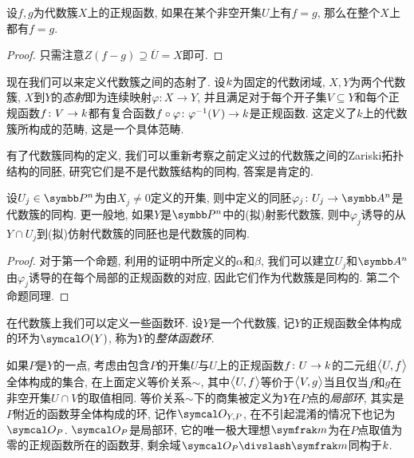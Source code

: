 \begin{proposition}\label{prop:regularstiffness}
    设$f, g$为代数簇$X$上的正规函数, 如果在某个非空开集$U$上有$f=g$, 那么在整个$X$上都有$f=g$.
\end{proposition}

\begin{proof}
    只需注意$Z(f-g)\supseteq \overline{U}=X$即可.
\end{proof}

现在我们可以来定义代数簇之间的态射了. 设$\kk$为固定的代数闭域, $X, Y$为两个代数簇, $X$到$Y$的\emph{态射}即为连续映射$\varphi\colon X\to Y$, 并且满足对于每个开子集$V\subseteq Y$和每个正规函数$f\colon V\to \kk$都有复合函数$f\circ\varphi\colon\varphi^{-1}(V)\to \kk$是正规函数. 这定义了$k$上的代数簇所构成的范畴, 这是一个具体范畴.

有了代数簇同构的定义, 我们可以重新考察之前定义过的代数簇之间的Zariski拓扑结构的同胚, 研究它们是不是代数簇结构的同构, 答案是肯定的.

\begin{proposition}
    设$U_j\in \PP^n$为由$X_j\neq 0$定义的开集, 则中定义的同胚$\varphi_j\colon U_j\to \AF^n$是代数簇的同构. 更一般地, 如果$Y$是$\PP^n$中的(拟)射影代数簇, 则中$\varphi_j$诱导的从$Y\cap U_j$到(拟)仿射代数簇的同胚也是代数簇的同构.
\end{proposition}

\begin{proof}
    对于第一个命题, 利用的证明中所定义的$\alpha$和$\beta$, 我们可以建立$U_j$和$\AF^n$由$\varphi_j$诱导的在每个局部的正规函数的对应, 因此它们作为代数簇是同构的. 第二个命题同理.
\end{proof}

在代数簇上我们可以定义一些函数环. 设$Y$是一个代数簇, 记$Y$的正规函数全体构成的环为$\OO (Y)$, 称为$Y$的\emph{整体函数环}.

如果$P$是$Y$的一点, 考虑由包含$P$的开集$U$与$U$上的正规函数$f\colon U\to \kk$的二元组$\lrbig<>{U, f}$全体构成的集合, 在上面定义等价关系$\sim$, 其中$\lrbig<>{U, f}$等价于$\lrbig<>{V, g}$当且仅当$f$和$g$在非空开集$U\cap V$的取值相同. 等价关系$\sim$下的商集被定义为$Y$在$P$点的\emph{局部环}, 其实是$P$附近的函数芽全体构成的环, 记作$\OO_{Y, P}$, 在不引起混淆的情况下也记为$\OO_P$. $\OO_P$是局部环, 它的唯一极大理想$\ideal{m}$为在$P$点取值为零的正规函数所在的函数芽, 剩余域$\OO_P{\divslash}\ideal{m}$同构于$\kk$.%


